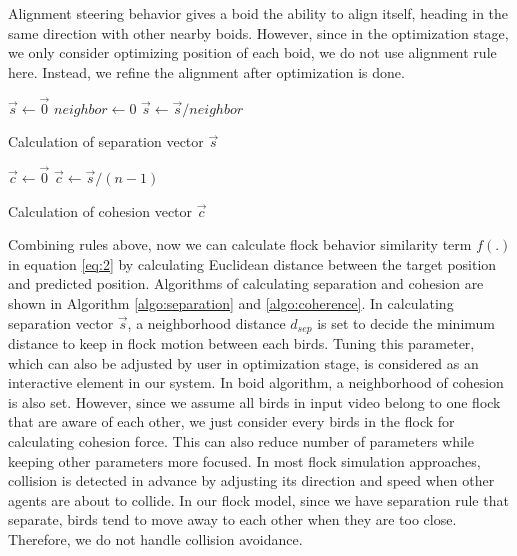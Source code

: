 Alignment steering behavior gives a boid the ability to align itself, heading in the same direction with other nearby boids. However, since in the optimization stage, we only consider optimizing position of each boid, we do not use alignment rule here. Instead, we refine the alignment after optimization is done.


\begin{algorithm}[p]
\SetAlgoLined
{}
$\vec{s} \leftarrow \vec{0}$ \;
$neighbor \leftarrow 0 $ \;
$\vec{s} \leftarrow \vec{s} / neighbor$ \;
\caption{Calculation of separation vector $\vec{s}$}
\label{algo:separation}
\end{algorithm}


\begin{algorithm}[p]
\SetAlgoLined
{}
$\vec{c} \leftarrow \vec{0}$ \;
$\vec{c} \leftarrow \vec{s} / (n-1)$ \;
\caption{Calculation of cohesion vector $\vec{c}$}
\label{algo:coherence}
\end{algorithm}


Combining rules above, now we can calculate flock behavior similarity term $f(.)$ in equation \ref{eq:2} by calculating Euclidean distance between the target position and predicted position. Algorithms of calculating separation and cohesion are shown in Algorithm \ref{algo:separation} and \ref{algo:coherence}. In calculating separation vector $\vec{s}$, a neighborhood distance $d_{sep}$ is set to decide the minimum distance to keep in flock motion between each birds. Tuning this parameter, which can also be adjusted by user in optimization stage, is considered as an interactive element in our system. In boid algorithm, a neighborhood of cohesion is also set. However, since we assume all birds in input video belong to one flock that are aware of each other, we just consider every birds in the flock for calculating cohesion force. This can also reduce number of parameters while keeping other parameters more focused.
In most flock simulation approaches, collision is detected in advance by adjusting its direction and speed when other agents are about to collide. In our flock model, since we have separation rule that separate, birds tend to move away to each other when they are too close. Therefore, we do not handle collision avoidance.


